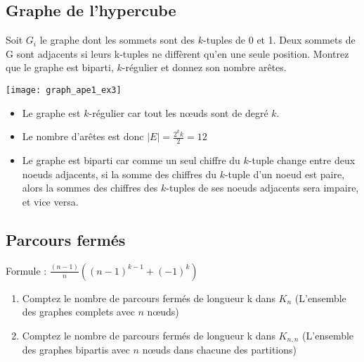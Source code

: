 \subsection{Graphe de l'hypercube}
Soit $G_{i}$ le graphe dont les sommets sont des $k$-tuples de 0 et 1.
Deux sommets de G sont adjacents si leurs k-tuples ne diffèrent qu'en une seule position.
Montrez que le graphe est biparti, $k$-régulier et donnez son nombre arêtes.

\begin{solution}
  \begin{minipage}{0.35\textwidth}
    \begin{flushleft}
      \texttt{[image: graph\_ape1\_ex3]}
    \end{flushleft}
  \end{minipage}
  \begin{minipage}{0.65\textwidth}
    \begin{flushright}
      \begin{itemize}
        \item Le graphe est $k$-régulier car tout les nœuds sont de degré $k$.
        \item Le nombre d'arêtes est donc $|E| = \frac{2^{k} k}{2} = 12$
        \item Le graphe est biparti car comme un seul chiffre du $k$-tuple change entre deux noeuds adjacents,
          si la somme des chiffres du $k$-tuple d'un noeud est paire, alors la sommes des chiffres des $k$-tuples de ses noeuds adjacents sera impaire, et vice versa.
      \end{itemize}
    \end{flushright}
  \end{minipage}
\end{solution}

\subsection{Parcours fermés}
Formule : $\frac{(n-1)}{n}((n-1)^{k-1}+(-1)^{k})$
\begin{enumerate}
\item{Comptez le nombre de parcours fermés de longueur k dans $K_{n}$ (L'ensemble des graphes complets avec $n$ nœuds)}
\item{Comptez le nombre de parcours fermés de longueur k dans $K_{n,n}$ (L'ensemble des graphes bipartis avec $n$ nœuds dans chacune des partitions)}
\end{enumerate}

